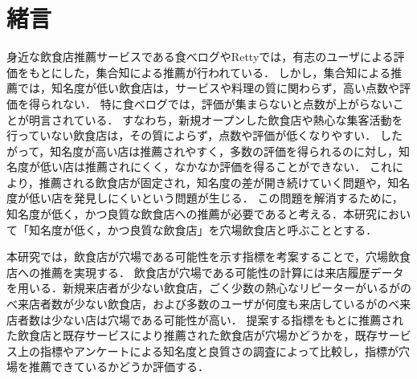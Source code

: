 \chapter{緒言}
\label{chap:intro}
身近な飲食店推薦サービスである食べログ\footnotemark{}やRetty\footnotemark{}では，有志のユーザによる評価をもとにした，集合知による推薦が行われている．
しかし，集合知による推薦では，知名度が低い飲食店は，サービスや料理の質に関わらず，高い点数や評価を得られない．
特に食べログでは，評価が集まらないと点数が上がらないことが明言されている\cite{score}．
すなわち，新規オープンした飲食店や熱心な集客活動を行っていない飲食店は，その質によらず，点数や評価が低くなりやすい．
したがって，知名度が高い店は推薦されやすく，多数の評価を得られるのに対し，知名度が低い店は推薦されにくく，なかなか評価を得ることができない．
これにより，推薦される飲食店が固定され，知名度の差が開き続けていく問題や，知名度が低い店を発見しにくいという問題が生じる．
この問題を解消するために，知名度が低く，かつ良質な飲食店への推薦が必要であると考える．本研究において「知名度が低く，かつ良質な飲食店」を穴場飲食店と呼ぶこととする．

本研究では，飲食店が穴場である可能性を示す指標を考案することで，穴場飲食店への推薦を実現する．
飲食店が穴場である可能性の計算には来店履歴データを用いる．新規来店者が少ない飲食店，ごく少数の熱心なリピーターがいるがのべ来店者数が少ない飲食店，および多数のユーザが何度も来店しているがのべ来店者数は少ない店は穴場である可能性が高い．
提案する指標をもとに推薦された飲食店と既存サービスにより推薦された飲食店が穴場かどうかを，既存サービス上の指標やアンケートによる知名度と良質さの調査によって比較し，指標が穴場を推薦できているかどうか評価する．
